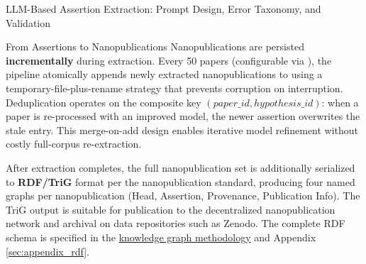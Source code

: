 \documentclass[
  ignorenonframetext,
]{beamer}
\begin{document}
\begin{frame}{LLM-Based Assertion Extraction:
Prompt Design, Error Taxonomy, and Validation
\label{sec:extraction_pipeline}}
\begin{block}{From Assertions to Nanopublications}
Nanopublications are persisted \textbf{incrementally} during extraction.
Every 50 papers (configurable via ), the
pipeline atomically appends newly extracted nanopublications to
 using a temporary-file-plus-rename
strategy that prevents corruption on interruption. Deduplication
operates on the composite key \((paper\_id, hypothesis\_id)\): when a
paper is re-processed with an improved model, the newer assertion
overwrites the stale entry. This merge-on-add design enables iterative
model refinement without costly full-corpus re-extraction.

After extraction completes, the full nanopublication set is additionally
serialized to \textbf{RDF/TriG} format per the nanopublication standard,
producing four named graphs per nanopublication (Head, Assertion,
Provenance, Publication Info). The TriG output is suitable for
publication to the decentralized nanopublication network and archival on
data repositories such as Zenodo. The complete RDF schema is specified
in the \hyperref[sec:methods_kg]{knowledge graph methodology} and
Appendix \ref{sec:appendix_rdf}.
\end{block}
\end{frame}
\end{document}

